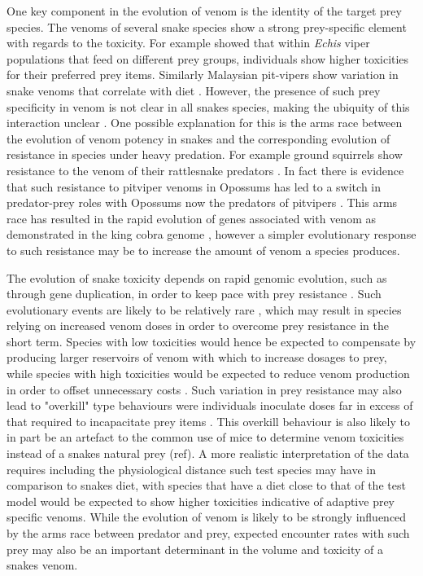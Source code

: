 One key component in the evolution of venom is the identity of the target prey species. The venoms of several snake species show a strong prey-specific element with regards to the toxicity. For example \cite{barlow2009coevolution} showed that within \textit{Echis} viper populations that feed on different prey groups, individuals show higher toxicities for their preferred prey items. Similarly Malaysian pit-vipers show variation in snake venoms that correlate with diet \citep{daltry1996diet}. However, the presence of such prey specificity in venom is not clear in all snakes species, making the ubiquity of this interaction unclear \citep{williams1988variation}. One possible explanation for this is the arms race between the evolution of venom potency in snakes and the corresponding evolution of resistance in species under heavy predation. For example ground squirrels show resistance to the venom of their rattlesnake predators \citep{poran1987resistance}. In fact there is evidence that such resistance to pitviper venoms in Opossums has led to a switch in predator-prey roles with Opossums now the predators of pitvipers \citep{voss2013opossums}. This arms race has resulted in the rapid evolution of genes associated with venom as demonstrated in the king cobra genome \citep{vonk2013king}, however a simpler evolutionary response to such resistance may be to increase the amount of venom a species produces.


The evolution of snake toxicity depends on rapid genomic evolution, such as through gene duplication, in order to keep pace with prey resistance \citep{vonk2013king}. Such evolutionary events are likely to be relatively rare \citep{vonk2013king}, which may result in species relying on increased venom doses in order to overcome prey resistance in the short term. Species with low toxicities would hence be expected to compensate by producing larger reservoirs of venom with which to increase dosages to prey, while species with high toxicities would be expected to reduce venom production in order to offset unnecessary costs \citep{mccue2006cost}. Such variation in prey resistance may also lead to "overkill" type behaviours were individuals inoculate doses far in excess of that required to incapacitate prey items \citep{sasa1999diet,mebs2001toxicity}. This overkill behaviour is also likely to in part be an artefact to the common use of mice to determine venom toxicities instead of a snakes natural prey (ref). A more realistic interpretation of the data requires including the physiological distance such test species may have in comparison to snakes diet, with species that have a diet close to that of the test model would be expected to show higher toxicities indicative of adaptive prey specific venoms. While the evolution of venom is likely to be strongly influenced by the arms race between predator and prey, expected encounter rates with such prey may also be an important determinant in the volume and toxicity of a snakes venom.


